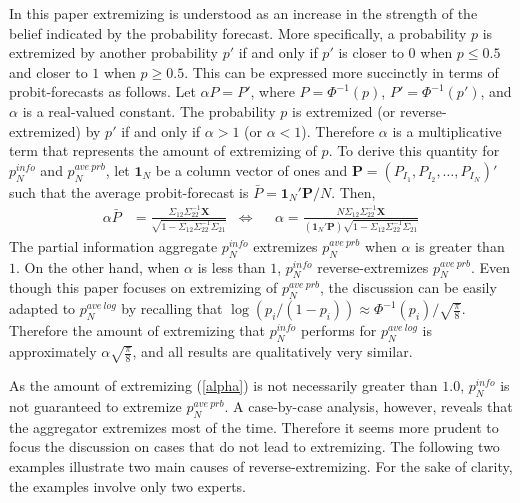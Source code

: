 \documentclass[11pt]{article}
\theoremstyle{definition}
\theoremstyle{definition}
\begin{document}
In this paper extremizing is understood as an increase in the strength of the belief indicated by the probability forecast. More specifically, a probability $p$ is extremized by another probability $p'$ if and only if $p'$ is closer to $0$ when $p \leq 0.5$ and closer to $1$ when $p \geq 0.5$. This can be expressed more succinctly in terms of probit-forecasts as follows. Let $\alpha P = P'$, where $P = \Phi^{-1}(p)$, $P' = \Phi^{-1}(p')$, and $\alpha$ is a real-valued constant. The probability $p$ is extremized (or reverse-extremized) by $p'$ if and only if $\alpha > 1$ (or $\alpha < 1$). Therefore $\alpha$ is a multiplicative term that represents the amount of extremizing of $p$. To derive this quantity for $p_N^{info}$ and $p_{N}^{ave\ prb}$, let $\boldsymbol{1}_N$ be a column vector of ones and $\boldsymbol{P} = (P_{I_1}, P_{I_2}, \dots, P_{I_N})'$ such that the average probit-forecast is $\bar{P} = \boldsymbol{1}_N' \boldsymbol{P} /N$. Then,
\begin{align}
\alpha \bar{P}&=  \frac{\Sigma_{12} \Sigma_{22}^{-1} \boldsymbol{X}}{\sqrt{1 - \Sigma_{12} \Sigma_{22}^{-1} \Sigma_{21}}}  &\Leftrightarrow&& \alpha  = \frac{N \Sigma_{12} \Sigma_{22}^{-1} \boldsymbol{X}}{\left(\boldsymbol{1}_N' \boldsymbol{P} \right) \sqrt{1 - \Sigma_{12} \Sigma_{22}^{-1} \Sigma_{21}}} \label{alpha}
\end{align}
The partial information aggregate $p_N^{info}$ extremizes $p_N^{ave\ prb}$ when $\alpha$ is greater than $1$. On the other hand, when $\alpha$ is less than $1$, $p_N^{info}$ reverse-extremizes $p_N^{ave\ prb}$. Even though this paper focuses on extremizing of $p_N^{ave\ prb}$, the discussion can be easily adapted to $p_N^{ave\ log}$ by recalling that $\log(p_i/(1-p_i)) \approx \Phi^{-1}(p_i)/\sqrt{\frac{\pi}{8}}$. Therefore the amount of extremizing that $p_N^{info}$ performs for $p_N^{ave\ log}$ is approximately $\alpha \sqrt{\frac{\pi}{8}}$, and all results are qualitatively very similar.


As the amount of extremizing (\ref{alpha}) is not necessarily greater than $1.0$, $p_N^{info}$ is not guaranteed to extremize $p_N^{ave\ prb}$. A case-by-case analysis, however, reveals that the aggregator extremizes most of the time. Therefore it seems more prudent to focus the discussion on cases that do not lead to extremizing. The following two examples illustrate two main causes of reverse-extremizing. For the sake of clarity, the examples involve only two experts. 

\end{document}
